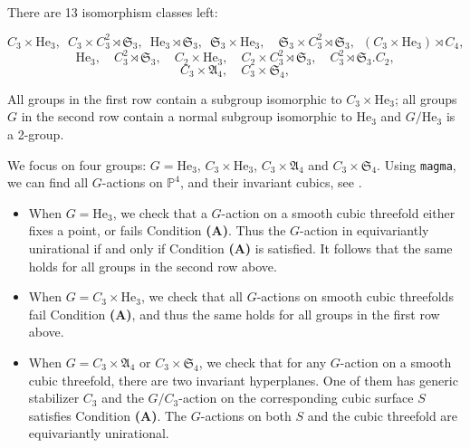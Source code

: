 \documentclass[12pt,reqno]{amsart}
\theoremstyle{plain}
\theoremstyle{remark}
\theoremstyle{definition}
\numberwithin{equation}{section}
\def\fA{{\mathfrak A}}
\def\fS{{\mathfrak S}}
\def\fS{{\mathfrak S}}
\def\bP{{\mathbb P}}
\begin{document}
\

There are 13 isomorphism classes left:

   {\small $$C_3\times \mathrm{He}_3,\,\,\, C_3\times C_3^2\rtimes \fS_3, \,\,\, \mathrm{He}_3\rtimes \fS_3, \,\,\, \fS_3\times \mathrm{He}_3,\quad  \fS_3\times C_3^2\rtimes \fS_3, \,\,\, (C_3\times\mathrm{He}_3)\rtimes C_4,$$
 $$\mathrm{He}_3,\quad C_3^2\rtimes \fS_3,\quad C_2\times\mathrm{He}_3,\quad C_2\times C_3^2\rtimes \fS_3,\quad C_3^2\rtimes \fS_3.C_2,$$
$$C_3\times\fA_4,\quad C_3\times \fS_4,$$}

All groups in the first row contain a subgroup isomorphic to $C_3\times\mathrm{He}_3$; all groups $G$ in the second row contain a normal subgroup isomorphic to $\mathrm{He}_3$ and $G/\mathrm{He}_3$ is a 2-group.  

We focus on four groups: $G=\mathrm{He}_3$, $C_3\times\mathrm{He}_3$, $C_3\times\fA_4$ and $C_3\times\fS_4$. Using {\tt magma}, we can find all $G$-actions on $\bP^4$, and their invariant cubics, see  \cite{CTZuni-tables}.
\begin{itemize}
    \item When $G=\mathrm{He}_3$, we check that a $G$-action on a smooth cubic threefold either fixes a point, or fails Condition {\bf (A)}. Thus the $G$-action in equivariantly unirational if and only if Condition {\bf (A)}  is satisfied. It follows that the same holds for all groups in the second row above.
    \item When $G=C_3\times \mathrm{He}_3$, we check that all $G$-actions on smooth cubic threefolds fail Condition {\bf (A)}, and thus the same holds for all groups in the first row above.
    \item  When $G=C_3\times \fA_4$ or $C_3\times\fS_4$, we check that for any $G$-action on a smooth cubic threefold, there are two invariant hyperplanes. One of them has generic stabilizer $C_3$ and the $G/C_3$-action on the corresponding cubic surface $S$ satisfies Condition {\bf (A)}. The $G$-actions on both $S$ and the cubic threefold are equivariantly unirational.
\end{itemize} 
\end{document}
